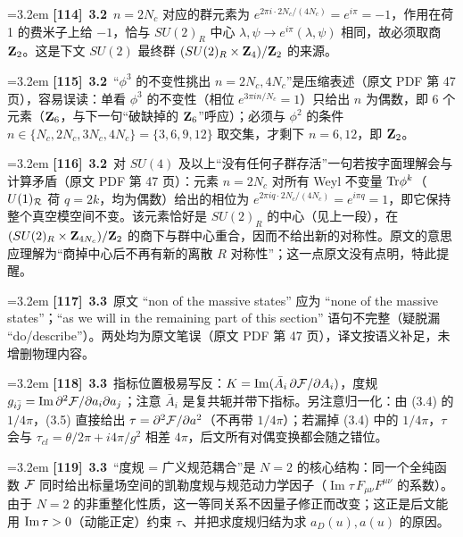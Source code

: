 \par
\par\medskip\noindent\hangindent=3.2em \textbf{[114]}~\textbf{3.2}~$n=2N_c$ 对应的群元素为 $e^{2\pi i\cdot2N_c/(4N_c)}=e^{i\pi}=-1$，作用在荷 1 的费米子上给 $-1$，恰与 $SU(2)_R$ 中心 $\lambda,\psi\to e^{i\pi}(\lambda,\psi)$ 相同，故必须取商 ${\bf Z}_2$。这是下文 $SU(2)$ 最终群 $(SU(2)_R\times{\bf Z}_4)/{\bf Z}_2$ 的来源。
\par
\par\medskip\noindent\hangindent=3.2em \textbf{[115]}~\textbf{3.2}~“$\phi^3$ 的不变性挑出 $n=2N_c,4N_c$”是压缩表述（原文 PDF 第 47 页），容易误读：单看 $\phi^3$ 的不变性（相位 $e^{3\pi i n/N_c}=1$）只给出 $n$ 为偶数，即 6 个元素（${\bf Z}_6$，与下一句“破缺掉的 ${\bf Z}_6$”呼应）；必须与 $\phi^2$ 的条件 $n\in\{N_c,2N_c,3N_c,4N_c\}=\{3,6,9,12\}$ 取交集，才剩下 $n=6,12$，即 ${\bf Z}_2$。
\par
\par\medskip\noindent\hangindent=3.2em \textbf{[116]}~\textbf{3.2}~对 $SU(4)$ 及以上“没有任何子群存活”一句若按字面理解会与计算矛盾（原文 PDF 第 47 页）：元素 $n=2N_c$ 对所有 Weyl 不变量 ${\rm Tr}\phi^k$（$U(1)_{\cal R}$ 荷 $q=2k$，均为偶数）给出的相位为 $e^{2\pi i q\cdot2N_c/(4N_c)}=e^{i\pi q}=1$，即它保持整个真空模空间不变。该元素恰好是 $SU(2)_R$ 的中心（见上一段），在 $(SU(2)_R\times{\bf Z}_{4N_c})/{\bf Z}_2$ 的商下与群中心重合，因而不给出新的对称性。原文的意思应理解为“商掉中心后不再有新的离散 $R$ 对称性”；这一点原文没有点明，特此提醒。
\par
\par\medskip\noindent\hangindent=3.2em \textbf{[117]}~\textbf{3.3}~原文 “non of the massive states” 应为 “none of the massive states”；“as we will in the remaining part of this section” 语句不完整（疑脱漏 “do/describe”）。两处均为原文笔误（原文 PDF 第 47 页），译文按语义补足，未增删物理内容。
\par
\par\medskip\noindent\hangindent=3.2em \textbf{[118]}~\textbf{3.3}~指标位置极易写反：$K={\rm Im}(\bar A_i\,\partial{\cal F}/\partial A_i)$，度规 $g_{i\bar j}={\rm Im}\,\partial^2{\cal F}/\partial a_i\partial a_j$；注意 $\bar A_i$ 是复共轭并带下指标。另注意归一化：由 (3.4) 的 $1/4\pi$，(3.5) 直接给出 $\tau=\partial^2{\cal F}/\partial a^2$（不再带 $1/4\pi$）；若漏掉 (3.4) 中的 $1/4\pi$，$\tau$ 会与 $\tau_{cl}=\theta/2\pi+i4\pi/g^2$ 相差 $4\pi$，后文所有对偶变换都会随之错位。
\par
\par\medskip\noindent\hangindent=3.2em \textbf{[119]}~\textbf{3.3}~“度规 = 广义规范耦合”是 $N=2$ 的核心结构：同一个全纯函数 ${\cal F}$ 同时给出标量场空间的凯勒度规与规范动力学因子（$\operatorname{Im}\tau\,F_{\mu\nu}F^{\mu\nu}$ 的系数）。由于 $N=2$ 的非重整化性质，这一等同关系不因量子修正而改变；这正是后文能用 ${\rm Im}\,\tau>0$（动能正定）约束 $\tau$、并把求度规归结为求 $a_D(u),a(u)$ 的原因。
